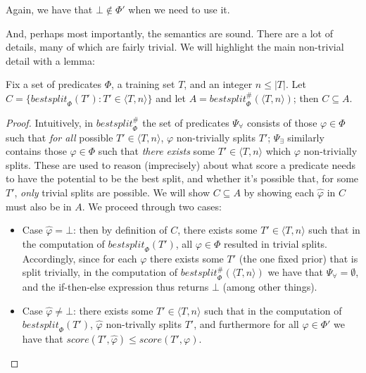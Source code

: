 Again, we have that $\bot \not \in \Phi'$ when we need to use it.
\begin{proposition}[todo]
\end{proposition}

And, perhaps most importantly, the semantics are sound.
There are a lot of details, many of which are fairly trivial.
We will highlight the main non-trivial detail with a lemma:
\begin{lemma}
Fix a set of predicates $\Phi$, a training set $T$, and an integer $n \leq |T|$.
Let $C = \{\mathit{bestsplit}_\Phi(T') : T' \in \langle T, n \rangle\}$
and let $A = \mathit{bestsplit}^\#_\Phi(\langle T, n \rangle)$;
then $C \subseteq A$.
\end{lemma}
\begin{proof}
Intuitively, in $\mathit{bestsplit}^\#_\Phi$ the set of predicates
$\Psi_\forall$ consists of those $\varphi \in \Phi$
such that \emph{for all} possible $T' \in \langle T, n \rangle$,
$\varphi$ non-trivially splits $T'$;
$\Psi_\exists$ similarly contains those $\varphi \in \Phi$
such that \emph{there exists} some $T' \in \langle T, n \rangle$
which $\varphi$ non-trivially splits.
These are used to reason (imprecisely) about
\rone what score a predicate needs to have the potential to be the best split, and
\rtwo whether it's possible that, for some $T'$, \emph{only} trivial splits are possible.
We will show $C \subseteq A$ by showing each $\hat{\varphi}$ in $C$ must also be in $A$.
We proceed through two cases:
\begin{itemize}
    \item Case $\hat{\varphi} = \bot$:
        then by definition of $C$, there exists some $T' \in \langle T, n \rangle$
        such that in the computation of $\mathit{bestsplit}_\Phi(T')$,
        all $\varphi \in \Phi$ resulted in trivial splits.
        Accordingly, since for each $\varphi$ there exists some $T'$ (the one fixed prior)
        that is split trivially, in the computation of
        $\mathit{bestsplit}^\#_\Phi(\langle T, n \rangle)$
        we have that $\Psi_\forall = \emptyset$,
        and the if-then-else expression thus returns $\bot$ (among other things).
    \item Case $\hat{\varphi} \neq \bot$:
        there exists some $T' \in \langle T, n \rangle$
        such that in the computation of $\mathit{bestsplit}_\Phi(T')$,
        \rone $\hat{\varphi}$ non-trivally splits $T'$, and furthermore
        \rtwo for all $\varphi \in \Phi'$ we have that
        $\mathit{score}(T', \hat{\varphi}) \leq \mathit{score}(T', \varphi)$.

\end{itemize}
\end{proof}
